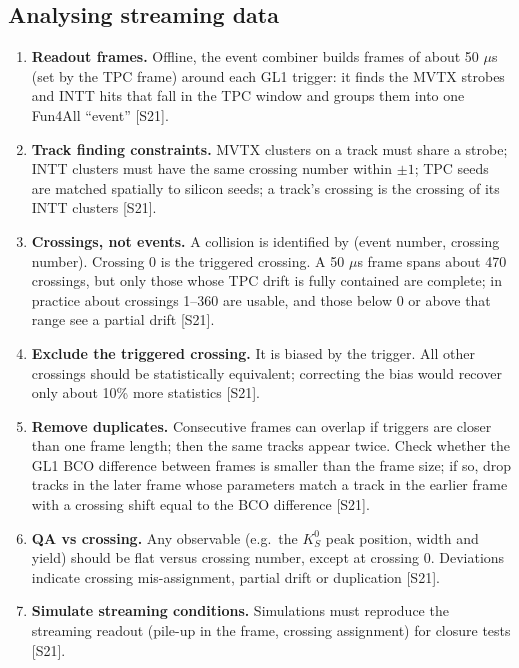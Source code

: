 \documentclass[11pt,letterpaper]{article}
\begin{document}
\subsection{Analysing streaming data}
\begin{enumerate}
\item \textbf{Readout frames.} Offline, the event combiner builds frames of about 50 $\mu$s (set by the TPC frame) around each GL1 trigger: it finds the MVTX strobes and INTT hits that fall in the TPC window and groups them into one Fun4All ``event'' [S21].
\item \textbf{Track finding constraints.} MVTX clusters on a track must share a strobe; INTT clusters must have the same crossing number within $\pm1$; TPC seeds are matched spatially to silicon seeds; a track's crossing is the crossing of its INTT clusters [S21].
\item \textbf{Crossings, not events.} A collision is identified by (event number, crossing number). Crossing 0 is the triggered crossing. A 50 $\mu$s frame spans about 470 crossings, but only those whose TPC drift is fully contained are complete; in practice about crossings 1--360 are usable, and those below 0 or above that range see a partial drift [S21].
\item \textbf{Exclude the triggered crossing.} It is biased by the trigger. All other crossings should be statistically equivalent; correcting the bias would recover only about 10\% more statistics [S21].
\item \textbf{Remove duplicates.} Consecutive frames can overlap if triggers are closer than one frame length; then the same tracks appear twice. Check whether the GL1 BCO difference between frames is smaller than the frame size; if so, drop tracks in the later frame whose parameters match a track in the earlier frame with a crossing shift equal to the BCO difference [S21].
\item \textbf{QA vs crossing.} Any observable (e.g.\ the $K^0_S$ peak position, width and yield) should be flat versus crossing number, except at crossing 0. Deviations indicate crossing mis-assignment, partial drift or duplication [S21].
\item \textbf{Simulate streaming conditions.} Simulations must reproduce the streaming readout (pile-up in the frame, crossing assignment) for closure tests [S21].
\end{enumerate}
\end{document}
